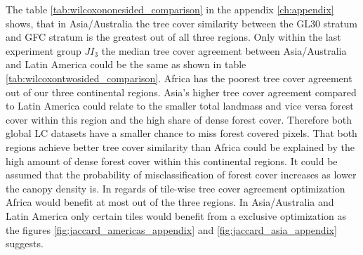 			The table \ref{tab:wilcoxononesided_comparison} in the appendix \ref{ch:appendix} shows, that in Asia/Australia the tree cover similarity between the \ac{GL30} stratum and \ac{GFC} stratum is the greatest out of all three regions. Only within the last experiment group $JI_3$ the median tree cover agreement between Asia/Australia and Latin America could be the same as shown in table \ref{tab:wilcoxontwosided_comparison}. Africa has the poorest tree cover agreement out of our three continental regions. Asia's higher tree cover agreement compared to Latin America could relate to the smaller total landmass and vice versa forest cover within this region and the high share of dense forest cover. Therefore both global \ac{LC} datasets have a smaller chance to miss forest covered pixels. That both regions achieve better tree cover similarity than Africa could be explained by the high amount of dense forest cover within this continental regions. It could be assumed that the probability of misclassification of forest cover increases as lower the canopy density is. In regards of tile-wise tree cover agreement optimization Africa would  benefit at most out of the three regions. In Asia/Australia and Latin America only certain tiles would benefit from a exclusive optimization as the figures \ref{fig:jaccard_americas_appendix} and \ref{fig:jaccard_asia_appendix} suggests.

